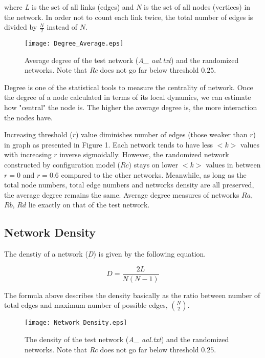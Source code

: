 \documentclass[12pt]{article}
\begin{document}
 where \textit{L} is the set of all links (edges) and \textit{N} is the set of all nodes (vertices) in the network. In order not to count each link twice, the total number of edges is divided by $\frac{N}{2}$ instead of $N$. 
 
\begin{figure}[h!]
	
	\centering
	\texttt{[image: Degree\_Average.eps]}
	\caption{Average degree of the test network (\textit{A\_ aal.txt}) and the randomized networks. Note that \textit{Rc} does not go far below threshold $0.25$.}
\end{figure}

Degree is one of the statistical tools to measure the centrality of network. Once the degree of a node calculated in terms of its local dynamics, we can estimate how "central" the node is. The higher the average degree is, the more interaction the nodes have. 

Increasing threshold ($r$) value diminishes number of edges (those weaker than $r$) in graph as presented in Figure 1. Each network tends to have less $<k>$ values with increasing $r$ inverse sigmoidally. However, the randomized network constructed by configuration model ($Rc$) stays on lower $<k>$ values in between $r=0$ and $r=0.6$ compared to the other networks.  Meanwhile, as long as the total node numbers, total edge numbers and networks density are all preserved, the average degree remains the same. Average degree measures of networks $Ra$, $Rb$, $Rd$ lie exactly on that of the test network. 
	
\newpage

\subsection{Network Density}

The denstiy of a network (\textit{D}) is given by the following equation.

\begin{equation}
D = \frac{2L}{N(N-1)}
\end{equation}	

The formula above describes the density basically as the ratio between number of total edges and maximum number of possible edges, ${N \choose 2} $.
	
\begin{figure}[h!]
	
	\centering
	\texttt{[image: Network\_Density.eps]}
	\caption{The density of the test network (\textit{A\_ aal.txt}) and the randomized networks. Note that \textit{Rc} does not go far below threshold $0.25$.}
\end{figure}
\end{document}
